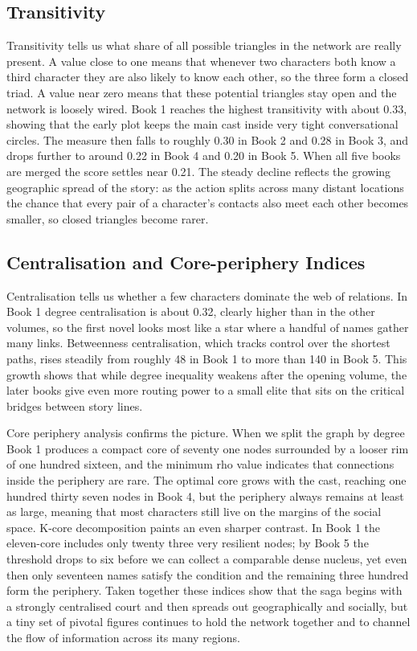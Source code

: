 \documentclass[12pt, a4paper]{article}
\begin{document}
\subsection*{Transitivity}
Transitivity tells us what share of all possible triangles in the network are really present. A value close to one means that whenever two characters both know a third character they are also likely to know each other, so the three form a closed triad. A value near zero means that these potential triangles stay open and the network is loosely wired. Book 1 reaches the highest transitivity with about 0.33, showing that the early plot keeps the main cast inside very tight conversational circles. The measure then falls to roughly 0.30 in Book 2 and 0.28 in Book 3, and drops further to around 0.22 in Book 4 and 0.20 in Book 5. When all five books are merged the score settles near 0.21. The steady decline reflects the growing geographic spread of the story: as the action splits across many distant locations the chance that every pair of a character's contacts also meet each other becomes smaller, so closed triangles become rarer.
\subsection*{Centralisation and Core-periphery Indices}
Centralisation tells us whether a few characters dominate the web of relations. In Book 1 degree centralisation is about 0.32, clearly higher than in the other volumes, so the first novel looks most like a star where a handful of names gather many links. Betweenness centralisation, which tracks control over the shortest paths, rises steadily from roughly 48 in Book 1 to more than 140 in Book 5. This growth shows that while degree inequality weakens after the opening volume, the later books give even more routing power to a small elite that sits on the critical bridges between story lines.

Core periphery analysis confirms the picture. 
When we split the graph by degree Book 1 produces a compact core of seventy 
one nodes surrounded by a looser rim of one hundred sixteen,
 and the minimum rho value indicates that connections inside the periphery are rare. 
 The optimal core grows with the cast, reaching one hundred thirty seven nodes in Book 4,
  but the periphery always remains at least as large, 
  meaning that most characters still live on the margins of the social space. 
  K-core decomposition paints an even sharper contrast. 
  In Book 1 the eleven-core includes only twenty three very resilient nodes; 
  by Book 5 the threshold drops to six before we can collect a comparable dense nucleus, 
  yet even then only seventeen names satisfy the condition and the remaining three 
  hundred form the periphery. Taken together these indices show that the saga begins 
  with a strongly centralised court and then spreads out geographically and socially, 
  but a tiny set of pivotal figures continues to hold the network together and to channel 
  the flow of information across its many regions.
\end{document}

